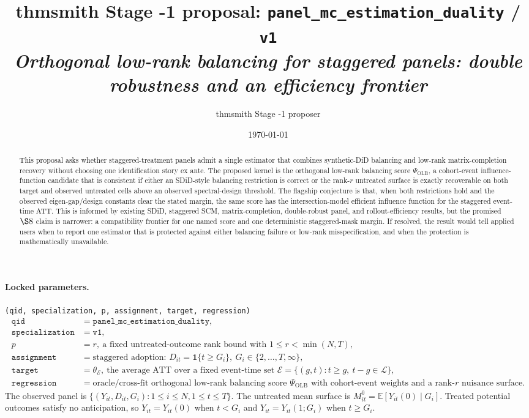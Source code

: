 \documentclass[11pt]{article}
\title{thmsmith Stage -1 proposal: \texttt{panel\_mc\_estimation\_duality} / \texttt{v1}%
  \\ \large\textit{Orthogonal low-rank balancing for staggered panels: double robustness and an efficiency frontier}}
\author{thmsmith Stage -1 proposer}
\date{\today}
\newcommand{\E}{\mathbb{E}}
\newcommand{\one}{\mathbf{1}}
\theoremstyle{definition}
\theoremstyle{plain}
\theoremstyle{remark}
\begin{document}
\maketitle


\paragraph{Locked parameters.}
\texttt{(qid, specialization, p, assignment, target, regression)}
\[
\begin{array}{ll}
\texttt{qid} & = \texttt{panel\_mc\_estimation\_duality},\\
\texttt{specialization} & = \texttt{v1},\\
p & = r,\ \text{a fixed untreated-outcome rank bound with }1\le r<\min(N,T),\\
\texttt{assignment} & = \text{staggered adoption: }D_{it}=\one\{t\ge G_i\},\ G_i\in\{2,\ldots,T,\infty\},\\
\texttt{target} & = \theta_{\mathcal{E}},\ \text{the average ATT over a fixed event-time set }\mathcal{E}
   =\{(g,t):t\ge g,\ t-g\in\mathcal{L}\},\\
\texttt{regression} & = \text{oracle/cross-fit orthogonal low-rank balancing score }\Psi_{\mathrm{OLB}}
   \text{ with cohort-event weights and a rank-}r\text{ nuisance surface.}
\end{array}
\]
The observed panel is \(\{(Y_{it},D_{it},G_i):1\le i\le N,1\le t\le T\}\).  The untreated mean surface is \(M^0_{it}=\E[Y_{it}(0)\mid G_i]\).  Treated potential outcomes satisfy no anticipation, so \(Y_{it}=Y_{it}(0)\) when \(t<G_i\) and \(Y_{it}=Y_{it}(1;G_i)\) when \(t\ge G_i\).

\begin{abstract}
This proposal asks whether staggered-treatment panels admit a single estimator that combines synthetic-DiD balancing and low-rank matrix-completion recovery without choosing one identification story ex ante.  The proposed kernel is the orthogonal low-rank balancing score \(\Psi_{\mathrm{OLB}}\), a cohort-event influence-function candidate that is consistent if either an SDiD-style balancing restriction is correct or the rank-\(r\) untreated surface is exactly recoverable on both target and observed untreated cells above an observed spectral-design threshold.  The flagship conjecture is that, when both restrictions hold and the observed eigen-gap/design constants clear the stated margin, the same score has the intersection-model efficient influence function for the staggered event-time ATT.  This is informed by existing SDiD, staggered SCM, matrix-completion, double-robust panel, and rollout-efficiency results, but the promised \(\S8\) claim is narrower: a compatibility frontier for one named score and one deterministic staggered-mask margin.  If resolved, the result would tell applied users when to report one estimator that is protected against either balancing failure or low-rank misspecification, and when the protection is mathematically unavailable.
\end{abstract}
\end{document}
